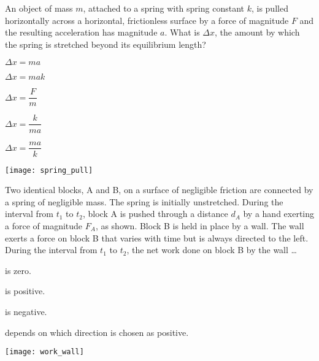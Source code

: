 \documentclass[11pt]{article}
\begin{document}
\begin{enumerate}
\begin{minipage}[t]{\lw}
\item An object of mass $m$, attached to a spring with spring constant $k$, is pulled horizontally across a horizontal, frictionless surface by a force of magnitude $F$ and the resulting acceleration has magnitude $a$. What is $\Delta x$, the amount by which the spring is stretched beyond its equilibrium length?\\
\begin{minipage}[t]{.45\lw}
\begin{choices}
\item $\Delta x=ma$
\item $\Delta x=mak$
\item $\Delta x=\dfrac{F}{m}$
\item $\Delta x=\dfrac{k}{ma}$
\item $\Delta x=\dfrac{ma}{k}$
\end{choices}
\end{minipage}\hfill
\begin{minipage}[t]{.5\lw}
\vspace{0in}
\flushright
\texttt{[image: spring\_pull]}
\end{minipage}
\end{minipage}

\begin{minipage}[t]{\lw}
\begin{minipage}[t]{.6\lw}
\item Two identical blocks, A and B, on a surface of negligible friction are connected by a spring of negligible mass. The spring is initially unstretched. During the interval from $t_1$ to $t_2$, block A is pushed through a distance $d_A$ by a hand exerting a force of magnitude $F_A$, as shown. Block B is held in place by a wall. The wall exerts a force on block B that varies with time but is always directed to the left. During the interval from $t_1$ to $t_2$, the net work done on block B by the wall \ldots
\begin{choices}
\item is zero.
\item is positive.
\item is negative.
\item depends on which direction is chosen as positive.
\end{choices}
\end{minipage}\hfill
\begin{minipage}[t]{.35\lw}
\vspace{0in}
\flushright
\texttt{[image: work\_wall]}
\end{minipage}
\end{minipage}


\end{enumerate}
\end{document}
